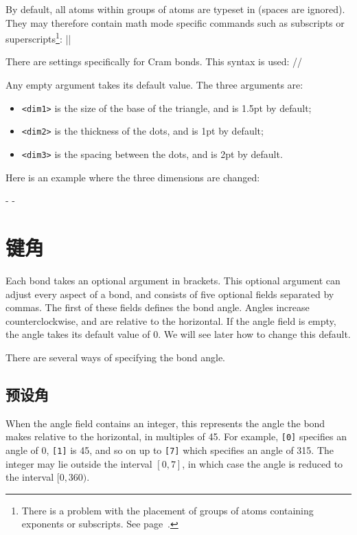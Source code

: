 \documentclass[10pt]{article}
\begin{document}
By default, all atoms within groups of atoms are typeset in  (spaces are ignored). They may therefore contain math mode specific commands such as subscripts or superscripts\footnote{There is a problem with the placement of groups of atoms containing exponents or subscripts. See page~\pageref{alignement.vertical}.}:
||

There are settings specifically for Cram bonds\idx*\setcrambond. This syntax is used: \label{setcrambond}
\centerverb//
\smallskip

Any empty argument takes its default value. The three arguments are:
\begin{itemize}
	\item \verb-<dim1>- is the size of the base of the triangle, and is 1.5pt by default;
	\item \verb-<dim2>- is the thickness of the dots, and is 1pt by default;
	\item \verb-<dim3>- is the spacing between the dots, and is 2pt by default.
\end{itemize}

Here is an example where the three dimensions are changed:

-\setcrambond{10pt}{0.4pt}{1pt}
	-

\section{键角}
Each bond takes an optional argument in brackets. This optional argument can adjust every aspect of a bond, and consists of five optional fields separated by commas. The first of these fields defines the bond angle. Angles increase counterclockwise, and are relative to the horizontal. If the angle field is empty, the angle takes its default value of 0\degres. We will see later how to change this default.

There are several ways of specifying the bond angle.
\subsection{预设角}
When the angle field contains an integer, this represents the angle the bond makes relative to the horizontal, in multiples of 45\degres. For example, \verb-[0]- specifies an angle of 0\degres, \verb-[1]- is 45\degres, and so on up to \verb-[7]- which specifies an angle of 315\degres. The integer may lie outside the interval $[0,7]$, in which case the angle is reduced to the interval $[0,360)$.
\end{document}
